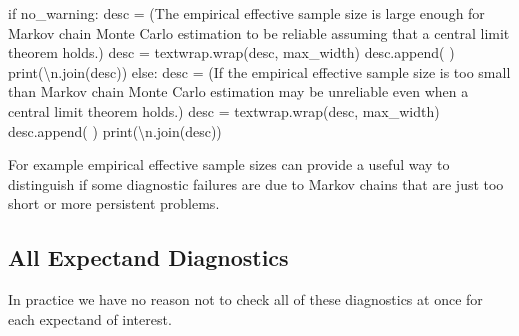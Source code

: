 \documentclass[
  letterpaper,
  DIV=11,
  numbers=noendperiod]{scrartcl}
\newenvironment{Shaded}{\begin{snugshade}}{\end{snugshade}}
\newcommand{\BuiltInTok}[1]{\textcolor[rgb]{0.00,0.23,0.31}{#1}}
\newcommand{\CharTok}[1]{\textcolor[rgb]{0.13,0.47,0.30}{#1}}
\newcommand{\ControlFlowTok}[1]{\textcolor[rgb]{0.00,0.23,0.31}{#1}}
\newcommand{\NormalTok}[1]{\textcolor[rgb]{0.00,0.23,0.31}{#1}}
\newcommand{\OperatorTok}[1]{\textcolor[rgb]{0.37,0.37,0.37}{#1}}
\newcommand{\StringTok}[1]{\textcolor[rgb]{0.13,0.47,0.30}{#1}}
\begin{document}
\begin{Shaded}
\begin{Highlighting}[]
  \ControlFlowTok{if}\NormalTok{ no\_warning:}
\NormalTok{    desc }\OperatorTok{=}\NormalTok{ (}\StringTok{\textquotesingle{}The empirical effective sample size is large enough for \textquotesingle{}}
            \StringTok{\textquotesingle{}Markov chain Monte Carlo estimation to be reliable \textquotesingle{}}
            \StringTok{\textquotesingle{}assuming that a central limit theorem holds.\textquotesingle{}}\NormalTok{)}
\NormalTok{    desc }\OperatorTok{=}\NormalTok{ textwrap.wrap(desc, max\_width)}
\NormalTok{    desc.append(}\StringTok{\textquotesingle{} \textquotesingle{}}\NormalTok{)}
    \BuiltInTok{print}\NormalTok{(}\StringTok{\textquotesingle{}}\CharTok{\textbackslash{}n}\StringTok{\textquotesingle{}}\NormalTok{.join(desc))}
  \ControlFlowTok{else}\NormalTok{:}
\NormalTok{    desc }\OperatorTok{=}\NormalTok{ (}\StringTok{\textquotesingle{}If the empirical effective sample size is too small than \textquotesingle{}}
            \StringTok{\textquotesingle{}Markov chain Monte Carlo estimation may be unreliable \textquotesingle{}}
            \StringTok{\textquotesingle{}even when a central limit theorem holds.\textquotesingle{}}\NormalTok{)}
\NormalTok{    desc }\OperatorTok{=}\NormalTok{ textwrap.wrap(desc, max\_width)}
\NormalTok{    desc.append(}\StringTok{\textquotesingle{} \textquotesingle{}}\NormalTok{)}
    \BuiltInTok{print}\NormalTok{(}\StringTok{\textquotesingle{}}\CharTok{\textbackslash{}n}\StringTok{\textquotesingle{}}\NormalTok{.join(desc))}
\end{Highlighting}
\end{Shaded}

For example empirical effective sample sizes can provide a useful way to
distinguish if some diagnostic failures are due to Markov chains that
are just too short or more persistent problems.

\hypertarget{all-expectand-diagnostics}{%
\subsection{All Expectand Diagnostics}\label{all-expectand-diagnostics}}

In practice we have no reason not to check all of these diagnostics at
once for each expectand of interest.
\end{document}
